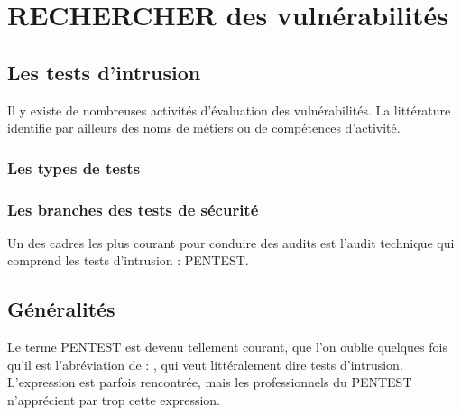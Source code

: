 \uchap{\jobname}


\section{RECHERCHER des vulnérabilités}

\subsection{Les tests d'intrusion}

Il y existe de nombreuses activités d'évaluation des vulnérabilités. La littérature identifie par ailleurs des noms de métiers ou de compétences d'activité.

\begin{frame}
\frametitle<presentation>{Les types de tests}
\end{frame}


\begin{frame}
\frametitle<presentation>{Les branches des tests de sécurité}
\end{frame}



Un des cadres les plus courant pour conduire des audits est l'audit technique qui comprend les tests d'intrusion : PENTEST.

\subsection{Généralités}

Le terme PENTEST est devenu tellement courant, que l'on oublie quelques fois qu'il est l'abréviation de : , qui  veut littéralement dire tests d'intrusion.  L'expression   est parfois rencontrée, mais les professionnels du PENTEST n'apprécient par trop cette expression. 

